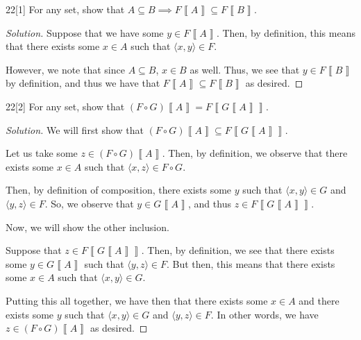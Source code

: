 \documentclass{article}
\newenvironment{solution}{\begin{proof}[Solution]}{\end{proof}}
\newcommand{\image}[1]{\left\llbracket {#1} \right\rrbracket}
\newcommand{\pr}[1]{\left( {#1} \right)}
\newcommand{\ang}[1]{\langle {#1} \rangle}
\begin{document}
	\begin{hw}{22}[1]
		For any set, show that $A \subseteq B \implies F \image{A} \subseteq F \image B$.
	\end{hw}
	\begin{solution}
		Suppose that we have some $y \in F\image{A}$. Then, by definition, this means that there exists some $x \in A$ such that $\ang{x,y} \in F$. 
	
		However, we note that since $A \subseteq B$, $x \in B$ as well. Thus, we see that $y \in F\image{B}$ by definition, and thus we have that $F\image{A} \subseteq F\image{B}$ as desired.
	\end{solution}
	
	\begin{hw}{22}[2]
		For any set, show that $(F \circ G)\image{A} = F\image{G\image{A}}$.
	\end{hw}
	\begin{solution}
		We will first show that $\pr{F \circ G}\image A \subseteq F\image{G\image{A}}$.
	
		Let us take some $z \in (F \circ G)\image A$. Then, by definition, we observe that there exists some $x \in A$ such that $\ang{x,z} \in F \circ G$.
		
		Then, by definition of composition, there exists some $y$ such that $\ang{x,y} \in G$ and $\ang{y,z} \in F$. So, we observe that $y \in G\image{A}$, and thus $z \in F \image{G\image{A}}$.
		
		Now, we will show the other inclusion.
		
		Suppose that $z \in F\image{G\image{A}}$. Then, by definition, we see that there exists some $y \in G\image{A}$ such that $\ang{y,z} \in F$. But then, this means that there exists some $x \in A$ such that $\ang{x,y} \in G$.
			
		Putting this all together, we have then that there exists some $x \in A$ and there exists some $y$ such that $\ang{x,y} \in G$ and $\ang{y,z} \in F$. In other words, we have $z \in (F \circ G)\image{A}$ as desired.
	\end{solution}
\end{document}
